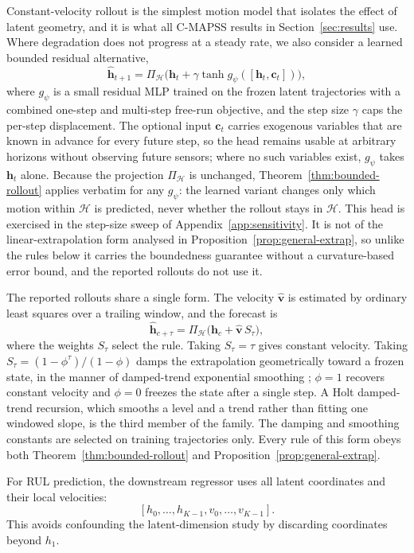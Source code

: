 \documentclass[a4paper,fleqn]{cas-sc}
\newcommand{\h}{\mathbf{h}}
\newcommand{\Hspace}{\mathcal{H}}
\begin{document}
Constant-velocity rollout is the simplest motion model that isolates the effect
of latent geometry, and it is what all C-MAPSS results in
Section~\ref{sec:results} use. Where degradation does not progress at a steady
rate, we also consider a learned bounded residual alternative,
\[
    \hat{\h}_{t+1}
    =
    \Pi_{\Hspace}
    \bigl(
    \h_t+\gamma\tanh g_\psi([\h_t,\mathbf{c}_t])
    \bigr),
\]
where $g_\psi$ is a small residual MLP trained on the frozen latent
trajectories with a combined one-step and multi-step free-run objective, and
the step size $\gamma$ caps the per-step displacement. The optional input
$\mathbf{c}_t$ carries exogenous variables that are known in advance for every
future step, so the head remains usable at arbitrary horizons without observing
future sensors; where no such variables exist, $g_\psi$ takes $\h_t$ alone.
Because the projection $\Pi_{\Hspace}$ is unchanged,
Theorem~\ref{thm:bounded-rollout} applies verbatim for any $g_\psi$: the
learned variant changes only which motion within $\Hspace$ is predicted, never
whether the rollout stays in $\Hspace$. This head is exercised in the step-size
sweep of Appendix~\ref{app:sensitivity}. It is not of the linear-extrapolation form
analysed in Proposition~\ref{prop:general-extrap}, so unlike the rules below it
carries the boundedness guarantee without a curvature-based error bound, and the
reported rollouts do not use it.

The reported rollouts share a single form. The velocity $\hat{\mathbf{v}}$ is
estimated by ordinary least squares over a trailing window, and the forecast is
\[
    \hat{\h}_{c+\tau}
    =
    \Pi_{\Hspace}\bigl(\h_c+\hat{\mathbf{v}}\,S_\tau\bigr),
\]
where the weights $S_\tau$ select the rule. Taking $S_\tau=\tau$ gives constant
velocity. Taking $S_\tau=(1-\phi^\tau)/(1-\phi)$ damps the extrapolation
geometrically toward a frozen state, in the manner of damped-trend exponential
smoothing \citep{gardner1985forecasting}; $\phi{=}1$ recovers constant velocity and
$\phi{=}0$ freezes the state after a single step. A Holt damped-trend recursion,
which smooths a level and a trend rather than fitting one windowed slope, is the
third member of the family. The damping and smoothing constants are selected on
training trajectories only. Every rule of this form obeys both
Theorem~\ref{thm:bounded-rollout} and Proposition~\ref{prop:general-extrap}.

For RUL prediction, the downstream regressor uses all latent coordinates and
their local velocities:
\[
    [h_0,\ldots,h_{K-1},v_0,\ldots,v_{K-1}].
\]
This avoids confounding the latent-dimension study by discarding coordinates
beyond $h_1$.
\end{document}
